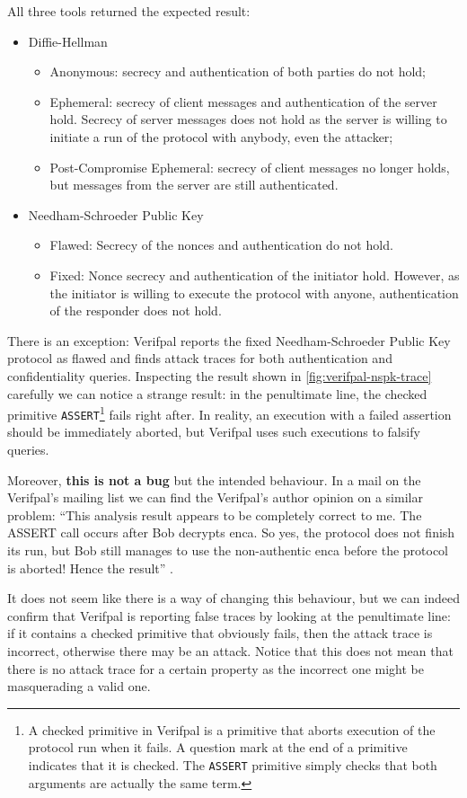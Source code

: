 All three tools returned the expected result:
\begin{itemize}
    \item{Diffie-Hellman
                \begin{itemize}
                    \item Anonymous: secrecy and authentication of both parties do not hold;
                    \item Ephemeral: secrecy of client messages and authentication of the server hold. Secrecy of server messages does not hold as the server is willing to initiate a run of the protocol with anybody, even the attacker;
                    \item Post-Compromise Ephemeral: secrecy of client messages no longer holds, but messages from the server are still authenticated.
                \end{itemize}
          }
    \item{Needham-Schroeder Public Key
                \begin{itemize}
                    \item Flawed: Secrecy of the nonces and authentication do not hold.
                    \item Fixed: Nonce secrecy and authentication of the initiator hold. However, as the initiator is willing to execute the protocol with anyone, authentication of the responder does not hold.
                \end{itemize}
          }
\end{itemize}

\lstset{language=verifpal}
There is an exception: Verifpal reports the fixed Needham-Schroeder Public Key  protocol as flawed and finds attack traces for both authentication and confidentiality queries.
Inspecting the result shown in \cref{fig:verifpal-nspk-trace} carefully we can notice a strange result: in the penultimate line, the checked primitive \lstinline{ASSERT}\footnote{A checked primitive in Verifpal is a primitive that aborts execution of the protocol run when it fails. A question mark at the end of a primitive indicates that it is checked. The \lstinline{ASSERT} primitive simply checks that both arguments are actually the same term.} fails right after. In reality, an execution with a failed assertion should be immediately aborted, but Verifpal uses such executions to falsify queries.

Moreover, \textbf{this is not a bug} but the intended behaviour. In a mail on the Verifpal's mailing list we can find the Verifpal's author opinion on a similar problem: ``This analysis result appears to be completely correct to me. The ASSERT call occurs after Bob decrypts enca. So yes, the protocol does not finish its run, but Bob still manages to use the non-authentic enca before the protocol is aborted! Hence the result'' \cite{VerifpalMail}.

It does not seem like there is a way of changing this behaviour, but we can indeed confirm that Verifpal is reporting false traces by looking at the penultimate line: if it contains a checked primitive that obviously fails, then the attack trace is incorrect, otherwise there may be an attack. Notice that this does not mean that there is no attack trace for a certain property as the incorrect one might be masquerading a valid one.
